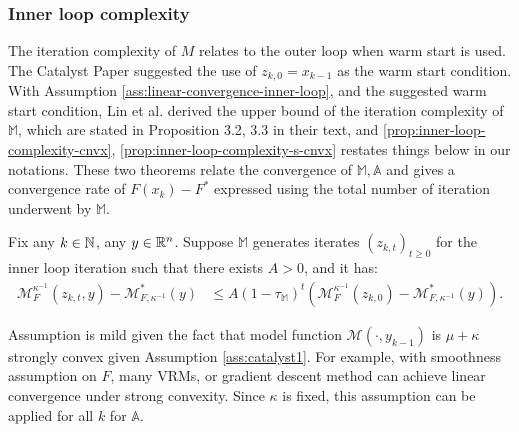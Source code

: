 \documentclass[12pt]{article}
\begin{document}
        \subsubsection{Inner loop complexity}
            The iteration complexity of $M$ relates to the outer loop when warm start is used. 
            The Catalyst Paper \cite{lin_universal_2015} suggested the use of $z_{k, 0} = x_{k - 1}$ as the warm start condition. 
            With Assumption \ref{ass:linear-convergence-inner-loop}, and the suggested warm start condition,  Lin et al. derived the upper bound of the iteration complexity of $\mathbb M$, which are stated in Proposition 3.2, 3.3 in their text, and \ref{prop:inner-loop-complexity-cnvx}, \ref{prop:inner-loop-complexity-s-cnvx} restates things below in our notations. 
            These two theorems relate the convergence of $\mathbb M, \mathbb A$ and gives a convergence rate of $F(x_k) - F^*$ expressed using the total number of iteration underwent by $\mathbb M$. 
            \begin{assumption}\label{ass:linear-convergence-inner-loop}
                Fix any $k \in \mathbb N$, any $y \in \mathbb R^n$. 
                Suppose $\mathbb M$ generates iterates $(z_{k, t})_{t \ge 0}$ for the inner loop iteration such that there exists $A > 0$, and it has: 
                \begin{align*}
                    \mathcal M_F^{\kappa^{-1}}(z_{k, t}, y) - \mathcal M^*_{F, \kappa^{-1}}(y) 
                    &\le 
                    A(1 - \tau_{\mathbb M})^t
                    \left(
                        \mathcal M_{F}^{\kappa^{-1}}(z_{k,0})
                        -
                        \mathcal M^*_{F, \kappa^{-1}}(y)
                    \right). 
                \end{align*}
            \end{assumption}
            \begin{remark}
                Assumption is mild given the fact that model function $\mathcal M(\cdot, y_{k - 1})$ is $\mu + \kappa$ strongly convex given Assumption \ref{ass:catalyst1}.
                For example, with smoothness assumption on $F$, many VRMs, or gradient descent method can achieve linear convergence under strong convexity. 
                Since $\kappa$ is fixed, this assumption can be applied for all $k$ for $\mathbb A$. 
            \end{remark}
\end{document}

